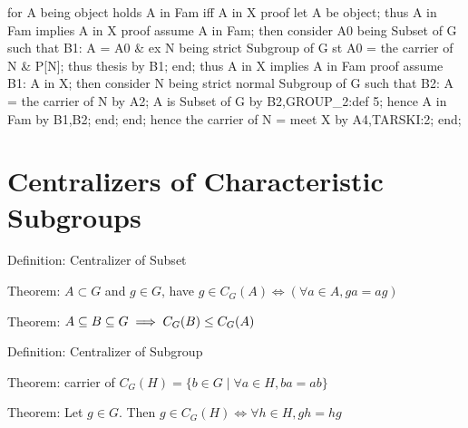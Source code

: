   for A being object holds A in Fam iff A in X
  proof
    let A be object;
    thus A in Fam implies A in X
    proof
      assume A in Fam;
      then consider A0 being Subset of G such that
      B1: A = A0 &
          ex N being strict Subgroup of G st A0 = the carrier of N & P[N];
      thus thesis by B1;
    end;
    thus A in X implies A in Fam
    proof
      assume B1: A in X;
      then consider N being strict normal Subgroup of G such that
      B2: A = the carrier of N
      by A2;
      A is Subset of G by B2,GROUP_2:def 5;
      hence A in Fam by B1,B2;
    end;
  end;
  hence the carrier of N = meet X by A4,TARSKI:2;
end;
\eatline
{}\nwendcode{}%

\section{Centralizers of Characteristic Subgroups}\label{sec:characteristic:centralizer}

\nwenddocs{}\endmoddef\nwstartdeflinemarkup{}\nwenddeflinemarkup
\LA{}Definition: Centralizer of Subset~{\nwtagstyle{}}\RA{}

\LA{}Theorem: $A\subset G$ and $g\in G$, have $g\in C_{G}(A)\iff(\forall a\in A, ga=ag)$~{\nwtagstyle{}}\RA{}

\LA{}Theorem: $A\subseteq B\subseteq G\implies C_{G}(B)\leq C_{G}(A)$~{\nwtagstyle{}}\RA{}

\LA{}Definition: Centralizer of Subgroup~{\nwtagstyle{}}\RA{}

\LA{}Theorem: carrier of $C_{G}(H) = \{b\in G\mid\forall a\in H, ba=ab\}$~{\nwtagstyle{}}\RA{}

\LA{}Theorem: Let $g\in G$. Then $g\in C_{G}(H)\iff\forall h\in H,gh=hg$~{\nwtagstyle{}}\RA{}

